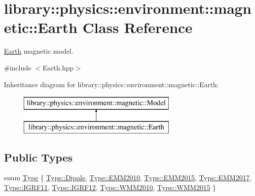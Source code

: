 \hypertarget{classlibrary_1_1physics_1_1environment_1_1magnetic_1_1_earth}{}\section{library\+:\+:physics\+:\+:environment\+:\+:magnetic\+:\+:Earth Class Reference}
\label{classlibrary_1_1physics_1_1environment_1_1magnetic_1_1_earth}


\hyperlink{classlibrary_1_1physics_1_1environment_1_1magnetic_1_1_earth}{Earth} magnetic model.  




{\ttfamily \#include $<$Earth.\+hpp$>$}

Inheritance diagram for library\+:\+:physics\+:\+:environment\+:\+:magnetic\+:\+:Earth\+:\begin{figure}[H]
\begin{center}
\leavevmode
\includegraphics[height=2.000000cm]{classlibrary_1_1physics_1_1environment_1_1magnetic_1_1_earth}
\end{center}
\end{figure}
\subsection*{Public Types}
\begin{DoxyCompactItemize}
\item 
enum \hyperlink{classlibrary_1_1physics_1_1environment_1_1magnetic_1_1_earth_ab9d257d23aa5899a3ef36c7dec62ef72}{Type} \{ \newline
\hyperlink{classlibrary_1_1physics_1_1environment_1_1magnetic_1_1_earth_ab9d257d23aa5899a3ef36c7dec62ef72a7627ce84eadbc3098e818fa89b368c2c}{Type\+::\+Dipole}, 
\hyperlink{classlibrary_1_1physics_1_1environment_1_1magnetic_1_1_earth_ab9d257d23aa5899a3ef36c7dec62ef72aed2fcd927feb1858e659c2278acc9b04}{Type\+::\+E\+M\+M2010}, 
\hyperlink{classlibrary_1_1physics_1_1environment_1_1magnetic_1_1_earth_ab9d257d23aa5899a3ef36c7dec62ef72abeb005aa2afa040561e58b462da8583d}{Type\+::\+E\+M\+M2015}, 
\hyperlink{classlibrary_1_1physics_1_1environment_1_1magnetic_1_1_earth_ab9d257d23aa5899a3ef36c7dec62ef72a19d30648df1be691437893aae34fcf62}{Type\+::\+E\+M\+M2017}, 
\newline
\hyperlink{classlibrary_1_1physics_1_1environment_1_1magnetic_1_1_earth_ab9d257d23aa5899a3ef36c7dec62ef72aa2ad57512dc0d08c7e8937152ebec747}{Type\+::\+I\+G\+R\+F11}, 
\hyperlink{classlibrary_1_1physics_1_1environment_1_1magnetic_1_1_earth_ab9d257d23aa5899a3ef36c7dec62ef72a9a61c68f57fc5ed7927cfcec00291c11}{Type\+::\+I\+G\+R\+F12}, 
\hyperlink{classlibrary_1_1physics_1_1environment_1_1magnetic_1_1_earth_ab9d257d23aa5899a3ef36c7dec62ef72acf25da7a5a5ba3ab08e4c26071ed0b20}{Type\+::\+W\+M\+M2010}, 
\hyperlink{classlibrary_1_1physics_1_1environment_1_1magnetic_1_1_earth_ab9d257d23aa5899a3ef36c7dec62ef72a164a99cca8995f690571ed8f964e6166}{Type\+::\+W\+M\+M2015}
 \}
\end{DoxyCompactItemize}
